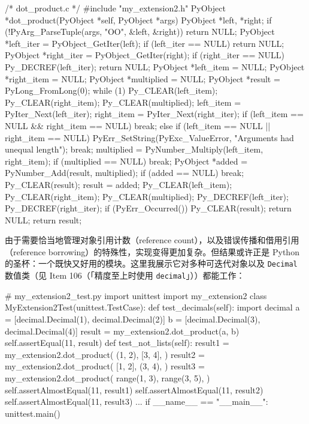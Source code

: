 \begin{codebox}[c]
/* dot_product.c */
#include "my_extension2.h"
PyObject *dot_product(PyObject *self, PyObject *args)
{
    PyObject *left, *right;
    if (!PyArg_ParseTuple(args, "OO", &left, &right)) {
        return NULL;
    }
    PyObject *left_iter = PyObject_GetIter(left);
    if (left_iter == NULL) {
        return NULL;
    }
    PyObject *right_iter = PyObject_GetIter(right);
    if (right_iter == NULL) {
        Py_DECREF(left_iter);
        return NULL;
    }
    PyObject *left_item = NULL;
    PyObject *right_item = NULL;
    PyObject *multiplied = NULL;
    PyObject *result = PyLong_FromLong(0);
    while (1) {
        Py_CLEAR(left_item);
        Py_CLEAR(right_item);
        Py_CLEAR(multiplied);
        left_item = PyIter_Next(left_iter);
        right_item = PyIter_Next(right_iter);
        if (left_item == NULL && right_item == NULL) {
            break;
        } else if (left_item == NULL || right_item == NULL) {
             PyErr_SetString(PyExc_ValueError,
"Arguments had unequal length");
            break;
        }
        multiplied = PyNumber_Multiply(left_item, right_item);
        if (multiplied == NULL) {
            break;
        }
        PyObject *added = PyNumber_Add(result, multiplied);
        if (added == NULL) {
            break;
        }
        Py_CLEAR(result);
        result = added;
    }
    Py_CLEAR(left_item);
    Py_CLEAR(right_item);
    Py_CLEAR(multiplied);
    Py_DECREF(left_iter);
    Py_DECREF(right_iter);
    if (PyErr_Occurred()) {
        Py_CLEAR(result);
        return NULL;
    }
    return result;
}
\end{codebox}

由于需要恰当地管理对象引用计数（reference count），以及错误传播和借用引用（reference borrowing）的特殊性，实现变得更加复杂。但结果或许正是 Python 的圣杯：一个既快又好用的模块。这里我展示它对多种可迭代对象以及 \texttt{Decimal} 数值类（见 Item 106（「精度至上时使用 \texttt{decimal}」））都能工作：

\begin{codebox}[python]
# my_extension2_test.py
import unittest
import my_extension2
class MyExtension2Test(unittest.TestCase):
    def test_decimals(self):
        import decimal
        a = [decimal.Decimal(1), decimal.Decimal(2)]
        b = [decimal.Decimal(3), decimal.Decimal(4)]
        result = my_extension2.dot_product(a, b)
        self.assertEqual(11, result)
    def test_not_lists(self):
        result1 = my_extension2.dot_product(
            (1, 2),
            [3, 4],
        )
        result2 = my_extension2.dot_product(
            [1, 2],
            (3, 4),
        )
        result3 = my_extension2.dot_product(
            range(1, 3),
            range(3, 5),
        )
        self.assertAlmostEqual(11, result1)
        self.assertAlmostEqual(11, result2)
        self.assertAlmostEqual(11, result3)
    ...
if __name__ == "__main__":
    unittest.main()
\end{codebox}

